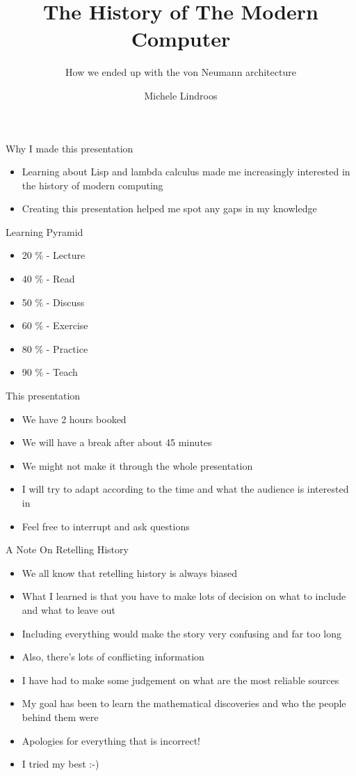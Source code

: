 \documentclass[utf8]{beamer}
\title{The History of The Modern Computer}
\subtitle{How we ended up with the von Neumann architecture}
\author{Michele Lindroos}
\begin{document}
\begin{frame}
\titlepage
\end{frame}

\begin{frame}{Why I made this presentation}
\begin{itemize}
\item Learning about Lisp and lambda calculus made me increasingly interested in the history of modern computing
\item Creating this presentation helped me spot any gaps in my knowledge
\end{itemize}
\end{frame}

\begin{frame}{Learning Pyramid}
\begin{itemize}
\item 20 \% - Lecture
\item 40 \% - Read
\item 50 \% - Discuss
\item 60 \% - Exercise
\item 80 \% - Practice
\item 90 \% - Teach
\end{itemize}
\end{frame}

\begin{frame}{This presentation}
\begin{itemize}
\item We have 2 hours booked
\item We will have a break after about 45 minutes
\item We might not make it through the whole presentation
\item I will try to adapt according to the time and what the audience is interested in
\item Feel free to interrupt and ask questions
\end{itemize}
\end{frame}

\begin{frame}{A Note On Retelling History}
\begin{itemize}
\item We all know that retelling history is always biased
\item What I learned is that you have to make lots of decision on what to include and what to leave out
\item Including everything would make the story very confusing and far too long
\item Also, there's lots of conflicting information
\item I have had to make some judgement on what are the most reliable sources
\item My goal has been to learn the mathematical discoveries and who the people behind them were
\item Apologies for everything that is incorrect!
\item I tried my best :-)
\end{itemize}
\end{frame}
\end{document}
